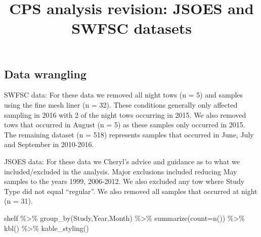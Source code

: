 \documentclass[
]{article}
\title{CPS analysis revision: JSOES and SWFSC datasets}
\author{}
\date{\vspace{-2.5em}}
\newenvironment{Shaded}{\begin{snugshade}}{\end{snugshade}}
\newcommand{\AttributeTok}[1]{\textcolor[rgb]{0.77,0.63,0.00}{#1}}
\newcommand{\FunctionTok}[1]{\textcolor[rgb]{0.00,0.00,0.00}{#1}}
\newcommand{\NormalTok}[1]{#1}
\newcommand{\SpecialCharTok}[1]{\textcolor[rgb]{0.00,0.00,0.00}{#1}}
\begin{document}
\maketitle

\hypertarget{data-wrangling}{%
\subsection{Data wrangling}\label{data-wrangling}}

SWFSC data: For these data we removed all night tows (n = 5) and samples
using the fine mesh liner (n = 32). These conditions generally only
affected sampling in 2016 with 2 of the night tows occurring in 2015. We
also removed tows that occurred in August (n = 5) as these samples only
occurred in 2015. The remaining dataset (n = 518) represents samples
that occurred in June, July and September in 2010-2016.

JSOES data: For these data we Cheryl's advice and guidance as to what we
included/excluded in the analysis. Major exclusions included reducing
May samples to the years 1999, 2006-2012. We also excluded any tow where
Study Type did not equal ``regular''. We also removed all samples that
occurred at night (n = 31).

\begin{Shaded}
\begin{Highlighting}[]
\NormalTok{shelf }\SpecialCharTok{\%\textgreater{}\%}
  \FunctionTok{group\_by}\NormalTok{(Study,Year,Month) }\SpecialCharTok{\%\textgreater{}\%}
  \FunctionTok{summarize}\NormalTok{(}\AttributeTok{count=}\FunctionTok{n}\NormalTok{()) }\SpecialCharTok{\%\textgreater{}\%}
  \FunctionTok{kbl}\NormalTok{() }\SpecialCharTok{\%\textgreater{}\%}
  \FunctionTok{kable\_styling}\NormalTok{()}
\end{Highlighting}
\end{Shaded}
\end{document}
